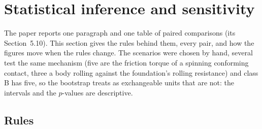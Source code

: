 \section{Statistical inference and sensitivity}\label{sup:inference}


The paper reports one paragraph and one table of paired comparisons (its Section~5.10). This
section gives the rules behind them, every pair, and how the figures move when the rules
change. The scenarios were chosen by hand, several test the same mechanism (five are the
friction torque of a spinning conforming contact, three a body rolling against the foundation's
rolling resistance) and class B has five, so the bootstrap treats as exchangeable units that are
not: the intervals and the $p$-values are descriptive.

\subsection{Rules}


